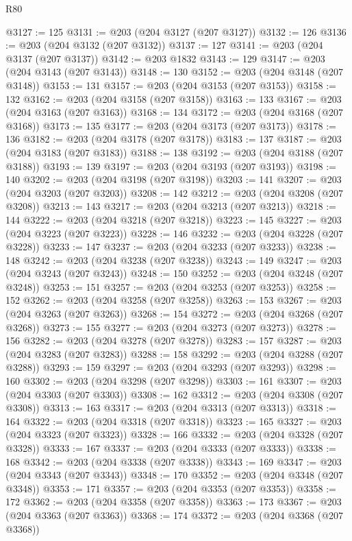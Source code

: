 \begin{lexlean}{R80}
\begin{coremodule}
@3127 := 125
@3131 := @203 (@204 @3127 (@207 @3127))
@3132 := 126
@3136 := @203 (@204 @3132 (@207 @3132))
@3137 := 127
@3141 := @203 (@204 @3137 (@207 @3137))
@3142 := @203 @1832
@3143 := 129
@3147 := @203 (@204 @3143 (@207 @3143))
@3148 := 130
@3152 := @203 (@204 @3148 (@207 @3148))
@3153 := 131
@3157 := @203 (@204 @3153 (@207 @3153))
@3158 := 132
@3162 := @203 (@204 @3158 (@207 @3158))
@3163 := 133
@3167 := @203 (@204 @3163 (@207 @3163))
@3168 := 134
@3172 := @203 (@204 @3168 (@207 @3168))
@3173 := 135
@3177 := @203 (@204 @3173 (@207 @3173))
@3178 := 136
@3182 := @203 (@204 @3178 (@207 @3178))
@3183 := 137
@3187 := @203 (@204 @3183 (@207 @3183))
@3188 := 138
@3192 := @203 (@204 @3188 (@207 @3188))
@3193 := 139
@3197 := @203 (@204 @3193 (@207 @3193))
@3198 := 140
@3202 := @203 (@204 @3198 (@207 @3198))
@3203 := 141
@3207 := @203 (@204 @3203 (@207 @3203))
@3208 := 142
@3212 := @203 (@204 @3208 (@207 @3208))
@3213 := 143
@3217 := @203 (@204 @3213 (@207 @3213))
@3218 := 144
@3222 := @203 (@204 @3218 (@207 @3218))
@3223 := 145
@3227 := @203 (@204 @3223 (@207 @3223))
@3228 := 146
@3232 := @203 (@204 @3228 (@207 @3228))
@3233 := 147
@3237 := @203 (@204 @3233 (@207 @3233))
@3238 := 148
@3242 := @203 (@204 @3238 (@207 @3238))
@3243 := 149
@3247 := @203 (@204 @3243 (@207 @3243))
@3248 := 150
@3252 := @203 (@204 @3248 (@207 @3248))
@3253 := 151
@3257 := @203 (@204 @3253 (@207 @3253))
@3258 := 152
@3262 := @203 (@204 @3258 (@207 @3258))
@3263 := 153
@3267 := @203 (@204 @3263 (@207 @3263))
@3268 := 154
@3272 := @203 (@204 @3268 (@207 @3268))
@3273 := 155
@3277 := @203 (@204 @3273 (@207 @3273))
@3278 := 156
@3282 := @203 (@204 @3278 (@207 @3278))
@3283 := 157
@3287 := @203 (@204 @3283 (@207 @3283))
@3288 := 158
@3292 := @203 (@204 @3288 (@207 @3288))
@3293 := 159
@3297 := @203 (@204 @3293 (@207 @3293))
@3298 := 160
@3302 := @203 (@204 @3298 (@207 @3298))
@3303 := 161
@3307 := @203 (@204 @3303 (@207 @3303))
@3308 := 162
@3312 := @203 (@204 @3308 (@207 @3308))
@3313 := 163
@3317 := @203 (@204 @3313 (@207 @3313))
@3318 := 164
@3322 := @203 (@204 @3318 (@207 @3318))
@3323 := 165
@3327 := @203 (@204 @3323 (@207 @3323))
@3328 := 166
@3332 := @203 (@204 @3328 (@207 @3328))
@3333 := 167
@3337 := @203 (@204 @3333 (@207 @3333))
@3338 := 168
@3342 := @203 (@204 @3338 (@207 @3338))
@3343 := 169
@3347 := @203 (@204 @3343 (@207 @3343))
@3348 := 170
@3352 := @203 (@204 @3348 (@207 @3348))
@3353 := 171
@3357 := @203 (@204 @3353 (@207 @3353))
@3358 := 172
@3362 := @203 (@204 @3358 (@207 @3358))
@3363 := 173
@3367 := @203 (@204 @3363 (@207 @3363))
@3368 := 174
@3372 := @203 (@204 @3368 (@207 @3368))

\end{coremodule}
\end{lexlean}
